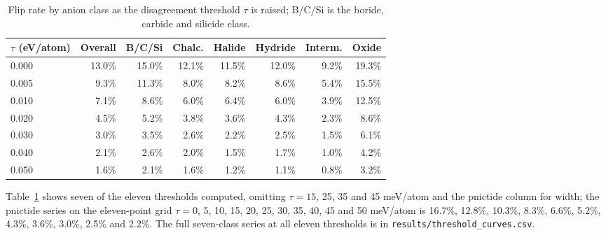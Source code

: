 \documentclass[11pt]{article}
\begin{document}
\begin{table}[htbp]\centering
\caption{Flip rate by anion class as the disagreement threshold $\tau$ is raised; B/C/Si is the boride, carbide and silicide class.}\label{tab:appthreshold}
\small
\begin{tabular}{lrrrrrrr}
\toprule
$\tau$ (eV/atom) & Overall & B/C/Si & Chalc. & Halide & Hydride & Interm. & Oxide \\
\midrule
0.000 & 13.0\% & 15.0\% & 12.1\% & 11.5\% & 12.0\% & \phantom{0}9.2\% & 19.3\% \\
0.005 & \phantom{0}9.3\% & 11.3\% & \phantom{0}8.0\% & \phantom{0}8.2\% & \phantom{0}8.6\% & \phantom{0}5.4\% & 15.5\% \\
0.010 & \phantom{0}7.1\% & \phantom{0}8.6\% & \phantom{0}6.0\% & \phantom{0}6.4\% & \phantom{0}6.0\% & \phantom{0}3.9\% & 12.5\% \\
0.020 & \phantom{0}4.5\% & \phantom{0}5.2\% & \phantom{0}3.8\% & \phantom{0}3.6\% & \phantom{0}4.3\% & \phantom{0}2.3\% & \phantom{0}8.6\% \\
0.030 & \phantom{0}3.0\% & \phantom{0}3.5\% & \phantom{0}2.6\% & \phantom{0}2.2\% & \phantom{0}2.5\% & \phantom{0}1.5\% & \phantom{0}6.1\% \\
0.040 & \phantom{0}2.1\% & \phantom{0}2.6\% & \phantom{0}2.0\% & \phantom{0}1.5\% & \phantom{0}1.7\% & \phantom{0}1.0\% & \phantom{0}4.2\% \\
0.050 & \phantom{0}1.6\% & \phantom{0}2.1\% & \phantom{0}1.6\% & \phantom{0}1.2\% & \phantom{0}1.1\% & \phantom{0}0.8\% & \phantom{0}3.2\% \\
\bottomrule
\end{tabular}
\end{table}

Table~\ref{tab:appthreshold} shows seven of the eleven thresholds computed, omitting $\tau = 15$, 25, 35
and 45 meV/atom and the pnictide column for width; the pnictide series on
the eleven-point grid $\tau = 0$, 5, 10, 15, 20, 25, 30, 35, 40, 45 and 50 meV/atom is
16.7\%, 12.8\%, 10.3\%, 8.3\%, 6.6\%, 5.2\%, 4.3\%, 3.6\%, 3.0\%, 2.5\% and 2.2\%. The
full seven-class series at all eleven thresholds is in
\texttt{results/threshold\_curves.csv}.
\end{document}
